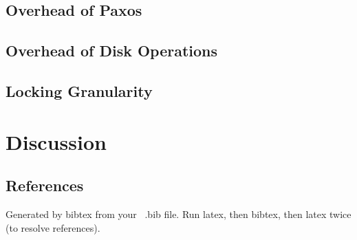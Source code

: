 \documentclass{vldb}
\begin{document}
\subsection{Overhead of Paxos}



\subsection{Overhead of Disk Operations}

\subsection{Locking Granularity}


\section{Discussion}




\subsection{References}
Generated by bibtex from your ~.bib file.  Run latex,
then bibtex, then latex twice (to resolve references).
\end{document}
